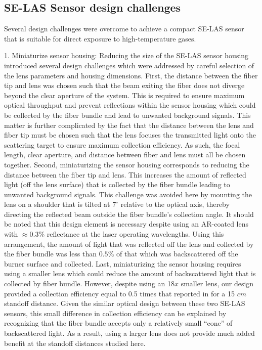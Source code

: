 \subsection{SE-LAS Sensor design challenges}
Several design challenges were overcome to achieve a compact SE-LAS sensor that is suitable for direct exposure to high-temperature gases.

1. Miniaturize sensor housing: Reducing the size of the SE-LAS sensor housing introduced several design challenges which were addressed by careful selection of the lens parameters and housing dimensions. First, the distance between the fiber tip and lens was chosen such that the beam exiting the fiber does not diverge beyond the clear aperture of the system. This is required to ensure maximum optical throughput and prevent reflections within the sensor housing which could be collected by the fiber bundle and lead to unwanted background signals. This matter is further complicated by the fact that the distance between the lens and fiber tip must be chosen such that the lens focuses the transmitted light onto the scattering target to ensure maximum collection efficiency. As such, the focal length, clear aperture, and distance between fiber and lens must all be chosen together.
Second, miniaturizing the sensor housing corresponds to reducing the distance between the fiber tip and lens. This increases the amount of reflected light (off the lens surface) that is collected by the fiber bundle leading to unwanted background signals. This challenge was avoided here by mounting the lens on a shoulder that is tilted at $7^{\circ}$ relative to the optical axis, thereby directing the reflected beam outside the fiber bundle’s collection angle. It should be noted that this design element is necessary despite using an AR-coated lens with $\approx 0.3\%$ reflectance at the laser operating wavelengths. Using this arrangement, the amount of light that was reflected off the lens and collected by the fiber bundle was less than $0.5\%$ of that which was backscattered off the burner surface and collected.
Last, miniaturizing the sensor housing requires using a smaller lens which could reduce the amount of backscattered light that is collected by fiber bundle. However, despite using an 18$x$ smaller lens, our design provided a collection efficiency equal to 0.5 times that reported in \cite{Goldenstein:16} for a 15 $cm$ standoff distance. Given the similar optical design between these two SE-LAS sensors, this small difference in collection efficiency can be explained by recognizing that the fiber bundle accepts only a relatively small “cone” of backscattered light. As a result, using a larger lens does not provide much added benefit at the standoff distances studied here.

